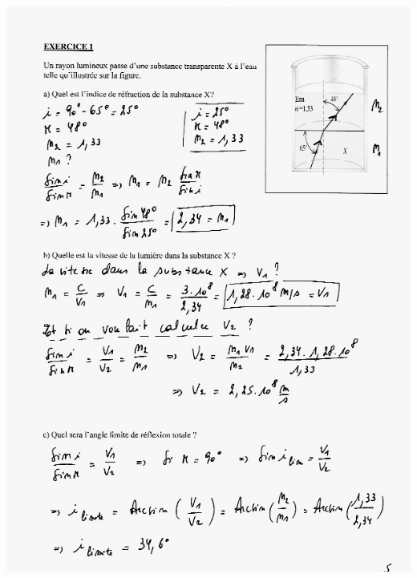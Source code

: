\includegraphics[width=17.503cm,height=24.477cm]{Pictures/10000001000002660000035BCA62AD70226081EC.png}

